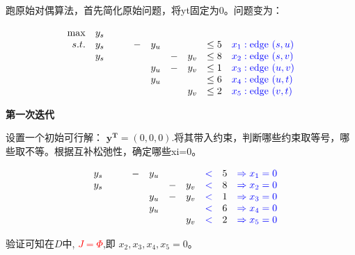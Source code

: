 \documentclass[11pt]{article}
\begin{document}
\begin{CJK}{UTF8}{gbsn}
跑原始对偶算法，首先简化原始问题，将yt固定为0。问题变为：
\begin{small}
\[
\begin{array}{rrrrrrrrrl}
 \max & y_s   & &   \\
 s.t. & y_s & &      &-& y_u & &     &  \leq 5 & \textcolor{blue}{x_{1}: \text{edge } (s,u)}  \\
      & y_s & &      & &     &-& y_v &  \leq 8 & \textcolor{blue}{x_{2}: \text{edge } (s,v)}   \\
      &     & &      & & y_u &-& y_v &  \leq 1 & \textcolor{blue}{x_{3}: \text{edge } (u,v)}  \\
      &     & &    &   & y_u & &     &  \leq 6 & \textcolor{blue}{x_{4}: \text{edge } (u,t)}  \\
      &     & &   & &     & & y_v &  \leq 2 & \textcolor{blue}{x_{5}: \text{edge } (v,t) } \\
\end{array} \nonumber
\]
\end{small}


\textbf{第一次迭代}

设置一个初始可行解： $\mathbf{y^T} = (0, 0, 0)$.将其带入约束，判断哪些约束取等号，哪些取不等。根据互补松弛性，确定哪些xi=0。
 \begin{small}
\[
\begin{array}{rrrrrrrrrrl}
 & y_s & &      &-& y_u & &     &  \textcolor{blue}{<}& 5 &  \textcolor{blue}{\Rightarrow  x_{1}  = 0}   \\
 & y_s & &      & &     &-& y_v &   \textcolor{blue}{<}&  8 & \textcolor{blue}{\Rightarrow  x_{2}  = 0}  \\
  &     & &      & & y_u &-& y_v &   \textcolor{blue}{<}&  1 & \textcolor{blue}{\Rightarrow  x_{3}  = 0} \\
 &     & &    &   & y_u & &     &   \textcolor{blue}{<}&  6 & \textcolor{blue}{\Rightarrow  x_{4}  = 0}  \\
 &     & &   & &     & & y_v &   \textcolor{blue}{<}&  2 & \textcolor{blue}{\Rightarrow  x_{5}  = 0}
\end{array} \nonumber
\]
\end{small}
验证可知在$D$中, \textcolor{red}{$J=\Phi$},即 $x_2,x_3,x_4,x_5=0$。


\end{CJK}
\end{document}
